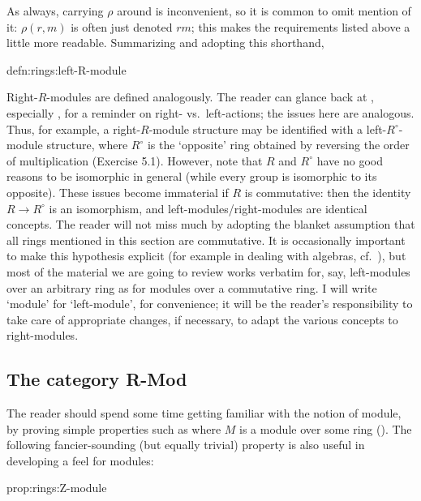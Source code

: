 As always, carrying $\rho$ around is inconvenient, so it is common to
omit mention of it: $\rho(r, m)$ is often just denoted $rm$; this
makes the requirements listed above a little more
readable. Summarizing and adopting this shorthand,
\begin{defn}{}{defn:rings:left-R-module}
\end{defn}
Right-$R$-modules are defined analogously. The reader can glance back
at , especially
, for a reminder on right- vs.\
left-actions; the issues here are analogous. Thus, for example, a
right-$R$-module structure may be identified with a
left-$R^\circ$-module structure, where $R^\circ$ is the `opposite'
ring obtained by reversing the order of multiplication (Exercise
5.1). However, note that $R$ and $R^\circ$ have no good reasons to be
isomorphic in general (while every group is isomorphic to its
opposite).  These issues become immaterial if $R$ is commutative: then
the identity $R \to R^\circ$ is an isomorphism, and
left-modules/right-modules are identical concepts. The reader will not
miss much by adopting the blanket assumption that all rings mentioned
in this section are commutative. It is occasionally important to make
this hypothesis explicit (for example in dealing with algebras, cf.\
), but most of the material
we are going to review works verbatim for, say, left-modules over an
arbitrary ring as for modules over a commutative ring. I will write
`module' for `left-module', for convenience; it will be the reader's
responsibility to take care of appropriate changes, if necessary, to
adapt the various concepts to right-modules.

\subsection{The category R-Mod}
\label{subsec:rings:the-category-r-mod}
The reader should spend some time getting familiar with the notion of
module, by proving simple properties such as
\tolean[Claude]{
\[
  (\forall m \in M) : 0 \cdot m = 0, \qquad (\forall m \in M) : (-1)
  \cdot m = -m,
\]
}
where $M$ is a module over some ring
(). The following fancier-sounding (but
equally trivial) property is also useful in developing a feel for
modules:
\begin{prop}{}{prop:rings:Z-module}
\end{prop}

